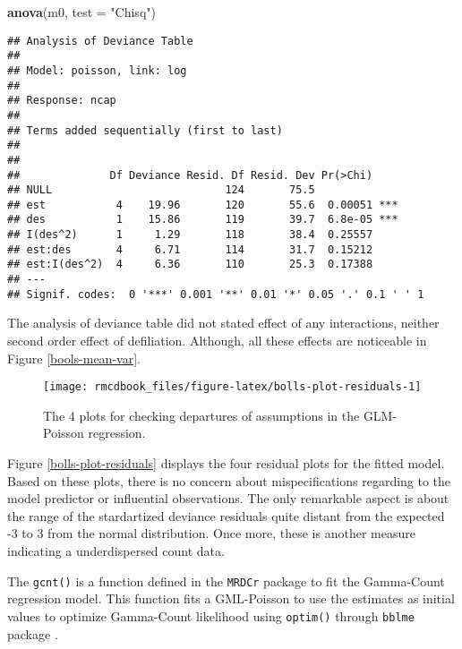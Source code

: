 \documentclass[9pt,a5paper,]{book}
\newenvironment{Shaded}{}{}
\newcommand{\KeywordTok}[1]{\textbf{{#1}}}
\newcommand{\DataTypeTok}[1]{\underline{{#1}}}
\newcommand{\StringTok}[1]{{#1}}
\newcommand{\NormalTok}[1]{{#1}}
\renewenvironment{Shaded}{\color{inputcolor}}{}
\renewcommand{\DataTypeTok}[1]{{#1}}
\theoremstyle{definition}
\theoremstyle{definition}
\theoremstyle{remark}
\begin{document}
\begin{Shaded}
\begin{Highlighting}[]
\KeywordTok{anova}\NormalTok{(m0, }\DataTypeTok{test =} \StringTok{"Chisq"}\NormalTok{)}
\end{Highlighting}
\end{Shaded}

\begin{verbatim}
## Analysis of Deviance Table
## 
## Model: poisson, link: log
## 
## Response: ncap
## 
## Terms added sequentially (first to last)
## 
## 
##              Df Deviance Resid. Df Resid. Dev Pr(>Chi)    
## NULL                           124       75.5             
## est           4    19.96       120       55.6  0.00051 ***
## des           1    15.86       119       39.7  6.8e-05 ***
## I(des^2)      1     1.29       118       38.4  0.25557    
## est:des       4     6.71       114       31.7  0.15212    
## est:I(des^2)  4     6.36       110       25.3  0.17388    
## ---
## Signif. codes:  0 '***' 0.001 '**' 0.01 '*' 0.05 '.' 0.1 ' ' 1
\end{verbatim}

The analysis of deviance table did not stated effect of any
interactions, neither second order effect of defiliation. Although, all
these effects are noticeable in Figure \ref{bools-mean-var}.

\begin{figure}[h]

{\centering \texttt{[image: rmcdbook\_files/figure-latex/bolls-plot-residuals-1]} 

}

\caption{The 4 plots for checking departures of assumptions in the GLM-Poisson regression.}\label{fig:bolls-plot-residuals}
\end{figure}

Figure \ref{bolls-plot-residuals} displays the four residual plots for
the fitted model. Based on these plots, there is no concern about
mispecifications regarding to the model predictor or influential
observations. The only remarkable aspect is about the range of the
stardartized deviance residuals quite distant from the expected -3 to 3
from the normal distribution. Once more, these is another measure
indicating a underdispersed count data.

The \texttt{gcnt()} is a function defined in the \texttt{MRDCr} package
\citep{mrdcr-pkg} to fit the Gamma-Count regression model. This function
fits a GML-Poisson to use the estimates as initial values to optimize
Gamma-Count likelihood using \texttt{optim()} through \texttt{bblme}
package \citep{bblme-pkg}.
\end{document}
